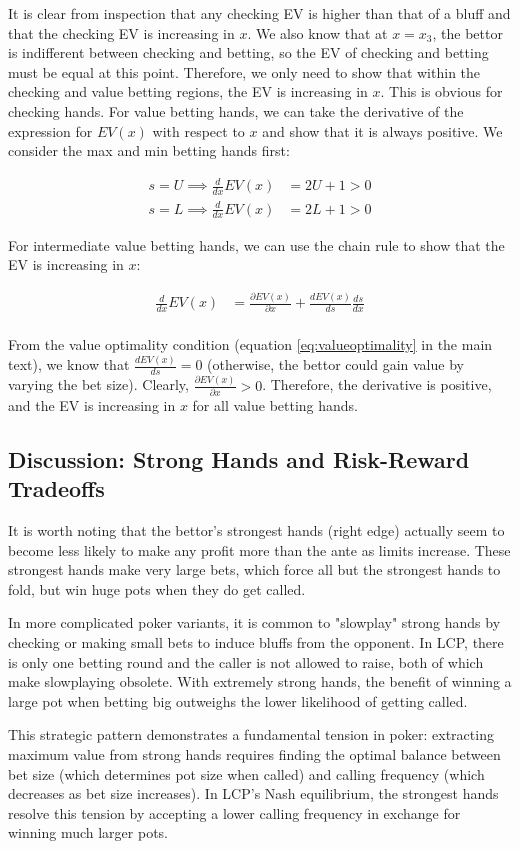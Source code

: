 \documentclass[../../main/main.tex]{subfiles}
\begin{document}
\begin{customproof}
    It is clear from inspection that any checking EV is higher than that of a bluff and that the checking EV is increasing in $x$. We also know that at $x=x_3$, the bettor is indifferent between checking and betting, so the EV of checking and betting must be equal at this point. Therefore, we only need to show that within the checking and value betting regions, the EV is increasing in $x$. This is obvious for checking hands. For value betting hands, we can take the derivative of the expression for $EV(x)$ with respect to $x$ and show that it is always positive. We consider the max and min betting hands first:

    \begin{align*}
        s = U \implies \frac{d}{dx} EV(x) & = 2U + 1 > 0  \\
        s = L \implies \frac{d}{dx} EV(x) & = 2L + 1 > 0
    \end{align*}

    For intermediate value betting hands, we can use the chain rule to show that the EV is increasing in $x$:

    \begin{align*}
        \frac{d}{dx} EV(x) & = \frac{\partial EV(x)}{\partial x} + \frac{dEV(x)}{ds} \frac{d s}{d x} \\
    \end{align*}

    From the value optimality condition (equation \ref{eq:valueoptimality} in the main text), we know that $\frac{dEV(x)}{ds} = 0$ (otherwise, the bettor could gain value by varying the bet size). Clearly, $\frac{\partial EV(x)}{\partial x} > 0$.  Therefore, the derivative is positive, and the EV is increasing in $x$ for all value betting hands.
\end{customproof}

\subsection{Discussion: Strong Hands and Risk-Reward Tradeoffs}

It is worth noting that the bettor's strongest hands (right edge) actually seem to become less likely to make any profit more than the ante as limits increase. These strongest hands make very large bets, which force all but the strongest hands to fold, but win huge pots when they do get called.

In more complicated poker variants, it is common to "slowplay" strong hands by checking or making small bets to induce bluffs from the opponent. In LCP, there is only one betting round and the caller is not allowed to raise, both of which make slowplaying obsolete. With extremely strong hands, the benefit of winning a large pot when betting big outweighs the lower likelihood of getting called.

This strategic pattern demonstrates a fundamental tension in poker: extracting maximum value from strong hands requires finding the optimal balance between bet size (which determines pot size when called) and calling frequency (which decreases as bet size increases). In LCP's Nash equilibrium, the strongest hands resolve this tension by accepting a lower calling frequency in exchange for winning much larger pots.
\end{document}
